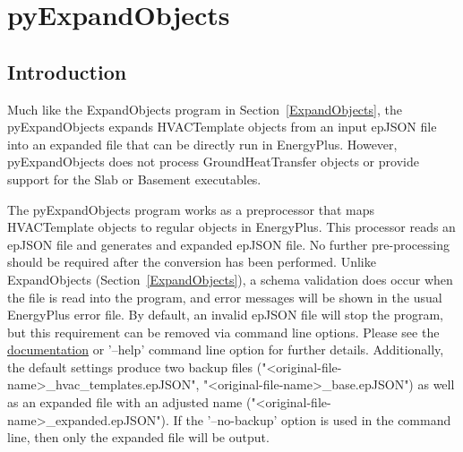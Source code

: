 \section{pyExpandObjects}

\subsection{Introduction}\label{pyExpandObjects}

Much like the ExpandObjects program in Section~\ref{ExpandObjects}, the pyExpandObjects expands HVACTemplate objects from an input epJSON file into an expanded file that can be directly run in EnergyPlus.  However, pyExpandObjects does not process GroundHeatTransfer objects or provide support for the Slab or Basement executables.

The pyExpandObjects program works as a preprocessor that maps HVACTemplate objects to regular objects in EnergyPlus.  This processor reads an epJSON file and generates and expanded epJSON file.  No further pre-processing should be required after the conversion has been performed.  Unlike ExpandObjects (Section~\ref{ExpandObjects}), a schema validation does occur when the file is read into the program, and error messages will be shown in the usual EnergyPlus error file.  By default, an invalid epJSON file will stop the program, but this requirement can be removed via command line options.  Please see the \href{https://epjson-expandobjects.readthedocs.io/en/latest/?badge=latest}{documentation} or '--help' command line option for further details.  Additionally, the default settings produce two backup files ("<original-file-name>\_hvac\_templates.epJSON", "<original-file-name>\_base.epJSON") as well as an expanded file with an adjusted name ("<original-file-name>\_expanded.epJSON"). If the '--no-backup' option is used in the command line, then only the expanded file will be output.